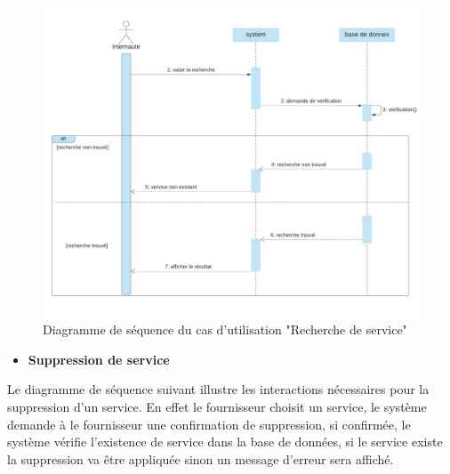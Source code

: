 \documentclass[french]{report}
\begin{document}
\begin{figure}[H]
    \centering
    \includegraphics[width=1\textwidth]{images/sequence diag recherche service.jpg}
    \caption{Diagramme de séquence du cas d'utilisation "Recherche de service"}
    \label{fig:my_label}
\end{figure}

\begin{itemize}
    \item \textbf{Suppression de service}
\end{itemize}

Le diagramme de séquence suivant illustre les interactions nécessaires pour la
suppression d'un service. En effet le fournisseur choisit un service, le système
demande à le fournisseur  une confirmation de suppression, si confirmée, le
système vérifie l'existence de service dans la base de données, si le service
existe la suppression va être appliquée sinon un message d'erreur sera
affiché.
\end{document}
